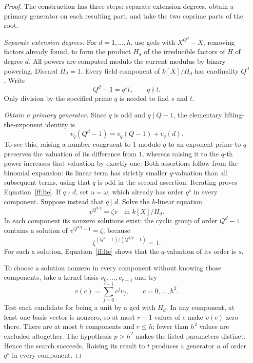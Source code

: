 \begin{proof}
The construction has three steps: separate extension degrees, obtain a primary
generator on each resulting part, and take the two coprime parts of the root.

\smallskip
\noindent\emph{Separate extension degrees.}
For $d=1,\ldots,h$, use gcds with $X^{Q^d}-X$, removing factors already found,
to form the product $H_d$ of the irreducible factors of $H$ of degree $d$.
All powers are computed modulo the current modulus by binary powering.
Discard $H_d=1$.  Every field component of $k[X]/H_d$ has cardinality $Q^d$.
Write
\[
 Q^d-1=q^s t,\qquad q\nmid t.
\]
Only division by the specified prime $q$ is needed to find $s$ and $t$.

\smallskip
\noindent\emph{Obtain a primary generator.}
Since $q$ is odd and $q\mid Q-1$, the elementary lifting-the-exponent identity
is
\begin{equation}
 v_q(Q^d-1)=v_q(Q-1)+v_q(d).
 \label{ff:lte}
\end{equation}
To see this, raising a number congruent to $1$ modulo $q$ to an exponent
prime to $q$ preserves the valuation of its difference from $1$, whereas
raising it to the $q$-th power increases that valuation by exactly one.
Both assertions follow from the binomial expansion: its linear term has
strictly smaller $q$-valuation than all subsequent terms, using that $q$
is odd in the second assertion.  Iterating proves Equation~\eqref{ff:lte}.
If $q\nmid d$, set $u=\omega$, which already has order $q^s$ in every
component.  Suppose instead that $q\mid d$.  Solve the $k$-linear equation
\begin{equation}
 v^{Q^{d/q}}=\zeta v
 \quad\text{in }k[X]/H_d.
 \label{ff:eigenvector}
\end{equation}
In each component its nonzero solutions exist: the cyclic group of order
$Q^d-1$ contains a solution of $v^{Q^{d/q}-1}=\zeta$, because
\[
 \zeta^{(Q^d-1)/(Q^{d/q}-1)}=1.
\]
For such a solution, Equation~\eqref{ff:lte} shows that the $q$-valuation of
its order is $s$.

To choose a solution nonzero in every component without knowing those
components, take a kernel basis $v_0,\ldots,v_{r-1}$ and try
\begin{equation}
 v(c)=\sum_{j=0}^{r-1}c^jv_j,
 \qquad c=0,\ldots,h^2.
 \label{ff:unit-search}
\end{equation}
Test each candidate for being a unit by a gcd with $H_d$.  In any component,
at least one basis vector is nonzero, so at most $r-1$ values of $c$ make
$v(c)$ zero there.  There are at most $h$ components and $r\le h$; fewer than
$h^2$ values are excluded altogether.  The hypothesis $p>h^2$ makes the
listed parameters distinct.  Hence the search succeeds.  Raising its result
to $t$ produces a generator $u$ of order $q^s$ in every component.


\end{proof}
